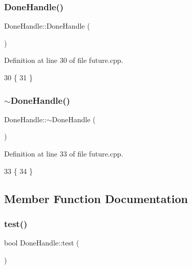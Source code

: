 \subsubsection{\texorpdfstring{Done\+Handle()}{DoneHandle()}}
{\footnotesize\ttfamily Done\+Handle\+::\+Done\+Handle (\begin{DoxyParamCaption}{ }\end{DoxyParamCaption})}



Definition at line 30 of file future.\+cpp.


\begin{DoxyCode}
30                        \{
31 \}
\end{DoxyCode}
\hypertarget{classshark_1_1_done_handle_a2b414f29067919ac09cc37fabf22e716}{}\label{classshark_1_1_done_handle_a2b414f29067919ac09cc37fabf22e716} 
\subsubsection{\texorpdfstring{$\sim$\+Done\+Handle()}{~DoneHandle()}}
{\footnotesize\ttfamily Done\+Handle\+::$\sim$\+Done\+Handle (\begin{DoxyParamCaption}{ }\end{DoxyParamCaption})\hspace{0.3cm}{\ttfamily [virtual]}}



Definition at line 33 of file future.\+cpp.


\begin{DoxyCode}
33                         \{
34 \}
\end{DoxyCode}


\subsection{Member Function Documentation}
\hypertarget{classshark_1_1_done_handle_aa2207dc4b61f0bffcbfb56aa9f9b0b46}{}\label{classshark_1_1_done_handle_aa2207dc4b61f0bffcbfb56aa9f9b0b46} 
\subsubsection{\texorpdfstring{test()}{test()}}
{\footnotesize\ttfamily bool Done\+Handle\+::test (\begin{DoxyParamCaption}{ }\end{DoxyParamCaption})\hspace{0.3cm}{\ttfamily [virtual]}}



